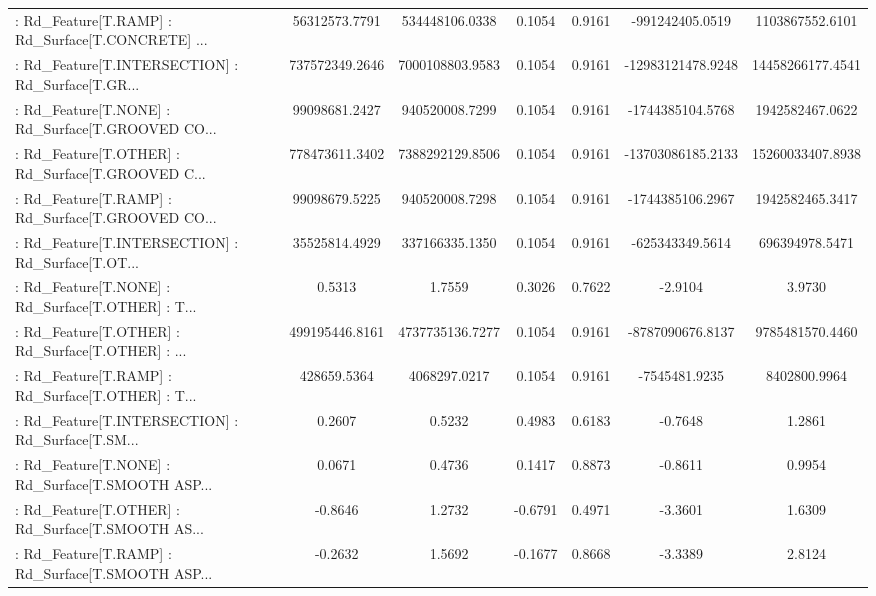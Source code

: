 \begin{longtable}{p{4cm}cccccc}
 : Rd\_Feature[T.RAMP] : Rd\_Surface[T.CONCRETE] ... &     56312573.7791 &    534448106.0338 &  0.1054 &       0.9161 &    -991242405.0519 &   1103867552.6101 \\
 : Rd\_Feature[T.INTERSECTION] : Rd\_Surface[T.GR... &    737572349.2646 &   7000108803.9583 &  0.1054 &       0.9161 &  -12983121478.9248 &  14458266177.4541 \\
 : Rd\_Feature[T.NONE] : Rd\_Surface[T.GROOVED CO... &     99098681.2427 &    940520008.7299 &  0.1054 &       0.9161 &   -1744385104.5768 &   1942582467.0622 \\
 : Rd\_Feature[T.OTHER] : Rd\_Surface[T.GROOVED C... &    778473611.3402 &   7388292129.8506 &  0.1054 &       0.9161 &  -13703086185.2133 &  15260033407.8938 \\
 : Rd\_Feature[T.RAMP] : Rd\_Surface[T.GROOVED CO... &     99098679.5225 &    940520008.7298 &  0.1054 &       0.9161 &   -1744385106.2967 &   1942582465.3417 \\
 : Rd\_Feature[T.INTERSECTION] : Rd\_Surface[T.OT... &     35525814.4929 &    337166335.1350 &  0.1054 &       0.9161 &    -625343349.5614 &    696394978.5471 \\
 : Rd\_Feature[T.NONE] : Rd\_Surface[T.OTHER] : T... &            0.5313 &            1.7559 &  0.3026 &       0.7622 &            -2.9104 &            3.9730 \\
 : Rd\_Feature[T.OTHER] : Rd\_Surface[T.OTHER] : ... &    499195446.8161 &   4737735136.7277 &  0.1054 &       0.9161 &   -8787090676.8137 &   9785481570.4460 \\
 : Rd\_Feature[T.RAMP] : Rd\_Surface[T.OTHER] : T... &       428659.5364 &      4068297.0217 &  0.1054 &       0.9161 &      -7545481.9235 &      8402800.9964 \\
 : Rd\_Feature[T.INTERSECTION] : Rd\_Surface[T.SM... &            0.2607 &            0.5232 &  0.4983 &       0.6183 &            -0.7648 &            1.2861 \\
 : Rd\_Feature[T.NONE] : Rd\_Surface[T.SMOOTH ASP... &            0.0671 &            0.4736 &  0.1417 &       0.8873 &            -0.8611 &            0.9954 \\
 : Rd\_Feature[T.OTHER] : Rd\_Surface[T.SMOOTH AS... &           -0.8646 &            1.2732 & -0.6791 &       0.4971 &            -3.3601 &            1.6309 \\
 : Rd\_Feature[T.RAMP] : Rd\_Surface[T.SMOOTH ASP... &           -0.2632 &            1.5692 & -0.1677 &       0.8668 &            -3.3389 &            2.8124 \\

\end{longtable}
